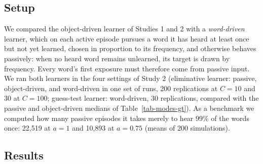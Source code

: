 \documentclass[a4paper,natbib,man]{apa6}
\begin{document}
\subsection{Setup}
We compared the object-driven learner of Studies 1 and 2 with a \textit{word-driven} learner, which on each active episode pursues a word it has heard at least once but not yet learned, chosen in proportion to its frequency, and otherwise behaves passively: when no heard word remains unlearned, its target is drawn by frequency. Every word's first exposure must therefore come from passive input. We ran both learners in the four settings of Study 2 (eliminative learner: passive, object-driven, and word-driven in one set of runs, 200 replications at $C=10$ and 30 at $C=100$; guess-test learner: word-driven, 30 replications, compared with the passive and object-driven medians of Table~\ref{tab-modes-gt}). As a benchmark we computed how many passive episodes it takes merely to hear 99\% of the words once: 22,519 at $a=1$ and 10,893 at $a=0.75$ (means of 200 simulations).

\subsection{Results}
\end{document}
